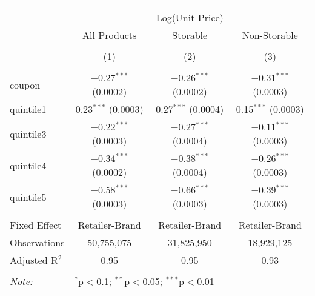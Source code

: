 
\begin{table}[!htbp] \centering 
  \caption{} 
  \label{tab:overallSavings} 
\begin{tabular}{@{\extracolsep{5pt}}lccc} 
\\[-1.8ex]\hline 
\hline \\[-1.8ex] 
 & \multicolumn{3}{c}{Log(Unit Price)} \\ 
\cline{2-4} 
 & All Products & Storable & Non-Storable \\ 
\\[-1.8ex] & (1) & (2) & (3)\\ 
\hline \\[-1.8ex] 
 coupon & $-$0.27$^{***}$ (0.0002) & $-$0.26$^{***}$ (0.0002) & $-$0.31$^{***}$ (0.0003) \\ 
  quintile1 & 0.23$^{***}$ (0.0003) & 0.27$^{***}$ (0.0004) & 0.15$^{***}$ (0.0003) \\ 
  quintile3 & $-$0.22$^{***}$ (0.0003) & $-$0.27$^{***}$ (0.0004) & $-$0.11$^{***}$ (0.0003) \\ 
  quintile4 & $-$0.34$^{***}$ (0.0002) & $-$0.38$^{***}$ (0.0004) & $-$0.26$^{***}$ (0.0003) \\ 
  quintile5 & $-$0.58$^{***}$ (0.0003) & $-$0.66$^{***}$ (0.0003) & $-$0.39$^{***}$ (0.0003) \\ 
 \hline \\[-1.8ex] 
Fixed Effect & Retailer-Brand & Retailer-Brand & Retailer-Brand \\ 
Observations & 50,755,075 & 31,825,950 & 18,929,125 \\ 
Adjusted R$^{2}$ & 0.95 & 0.95 & 0.93 \\ 
\hline 
\hline \\[-1.8ex] 
\textit{Note:}  & \multicolumn{3}{l}{$^{*}$p$<$0.1; $^{**}$p$<$0.05; $^{***}$p$<$0.01} \\ 
\end{tabular} 
\end{table} 
